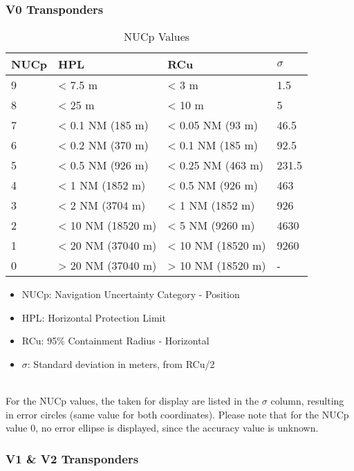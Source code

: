\subsubsection{V0 Transponders}

\begin{table}[H]
  \center
  \begin{tabular}{ | l | l | l | l |}
    \hline
    \textbf{NUCp} & \textbf{HPL} & \textbf{RCu} & \textbf{$\sigma$} \\ \hline
    9   & < 7.5 m            & < 3 m             & 1.5  \\ \hline
    8   & < 25 m             & < 10 m            & 5  \\ \hline
    7   & < 0.1 NM (185 m)   & < 0.05 NM (93 m)  & 46.5  \\ \hline
    6   & < 0.2 NM (370 m)   & < 0.1 NM (185 m)  & 92.5  \\ \hline
    5   & < 0.5 NM (926 m)   & < 0.25 NM (463 m) & 231.5  \\ \hline
    4   & < 1 NM (1852 m)    & < 0.5 NM (926 m)  & 463  \\ \hline
    3   & < 2 NM (3704 m)    & < 1 NM (1852 m)   & 926  \\ \hline
    2   & < 10 NM (18520 m)  & < 5 NM (9260 m)   & 4630  \\ \hline
    1   & < 20 NM (37040 m)  & < 10 NM (18520 m) & 9260  \\ \hline
    0   & > 20 NM (37040 m)  & > 10 NM (18520 m) & -  \\ \hline
  \end{tabular}
  \caption{NUCp Values}
\end{table}

\begin{itemize}
\item NUCp: Navigation Uncertainty Category - Position
\item HPL: Horizontal Protection Limit
\item RCu: 95\% Containment Radius - Horizontal
\item $\sigma$: Standard deviation in meters, from RCu/2
\end{itemize}
\ \\

For the NUCp values, the taken for display are listed in the $\sigma$ column, resulting in error circles (same value for both coordinates). Please note that for the NUCp value 0, no error ellipse is displayed, since the accuracy value is unknown.

\subsubsection{V1 \& V2 Transponders}

